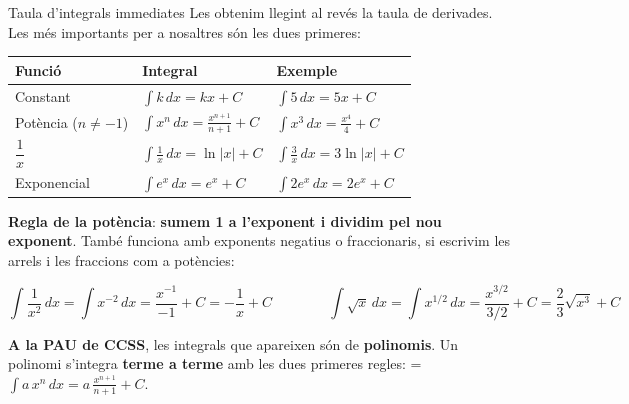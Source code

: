 \documentclass[11pt,a4paper]{article}
\newcommand{\fmm}[1]{\setbox0=\hbox{$#1$}\ifdim\wd0>\linewidth\[#1\]\else\mbox{\box0}\fi}
\newcommand{\fmuline}[1]{\textbf{\color{fmaccent}#1}}
\begin{document}
  
\begin{fmdef}{Taula d'integrals immediates}
Les obtenim llegint al revés la taula de derivades. Les més importants per a nosaltres són les dues primeres:

      
\begin{center}\renewcommand{\arraystretch}{2.3}\small\begin{tabularx}{\linewidth}{>{\raggedright\arraybackslash}p{3.2cm}>{\centering\arraybackslash}X>{\centering\arraybackslash}X}\toprule
\textbf{Funció} & \textbf{Integral} & \textbf{Exemple}\\\midrule
Constant & $\displaystyle\int k\,dx=kx+C$ & $\displaystyle\int 5\,dx=5x+C$\\[3pt]
Potència ($n\neq-1$) & $\displaystyle\int x^n\,dx=\frac{x^{n+1}}{n+1}+C$ & $\displaystyle\int x^3\,dx=\frac{x^4}{4}+C$\\[3pt]
$\dfrac1x$ & $\displaystyle\int \frac1x\,dx=\ln|x|+C$ & $\displaystyle\int \frac3x\,dx=3\ln|x|+C$\\[3pt]
Exponencial & $\displaystyle\int e^x\,dx=e^x+C$ & $\displaystyle\int 2e^x\,dx=2e^x+C$\\[3pt]
\bottomrule\end{tabularx}\end{center}

      

\fmuline{Regla de la potència}: \textbf{sumem 1 a l'exponent i dividim pel nou exponent}. També funciona amb exponents negatius o fraccionaris, si escrivim les arrels i les fraccions com a potències:

      
\[\int\frac{1}{x^2}\,dx=\int x^{-2}\,dx=\frac{x^{-1}}{-1}+C=-\frac1x+C\qquad\qquad\int\sqrt x\,dx=\int x^{1/2}\,dx=\frac{x^{3/2}}{3/2}+C=\frac{2}{3}\sqrt{x^3}+C\]

      
\begin{fmnote}\fmuline{A la PAU de CCSS}, les integrals que apareixen són de \textbf{polinomis}. Un polinomi s'integra \textbf{terme a terme} amb les dues primeres regles: \fmm{\displaystyle\int a\,x^n\,dx=a\,\frac{x^{n+1}}{n+1}+C}.\end{fmnote}
\end{fmdef}
\end{document}
